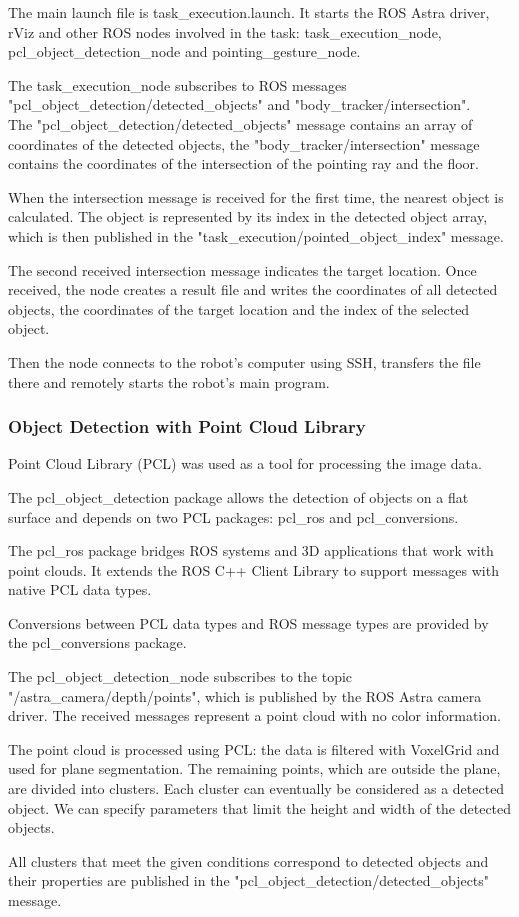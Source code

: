 The main launch file is task\_execution.launch. It starts the ROS Astra driver, rViz and other ROS nodes involved in the task: task\_execution\_node, pcl\_object\_detection\_node and pointing\_gesture\_node.\par
The task\_execution\_node subscribes to ROS messages\\
"pcl\_object\_detection/detected\_objects" and "body\_tracker/intersection".\\
The "pcl\_object\_detection/detected\_objects" message contains an array of coordinates of the detected objects, the "body\_tracker/intersection" message contains the coordinates of the intersection of the pointing ray and the floor.\par
When the intersection message is received for the first time, the nearest object is calculated. The object is represented by its index in the detected object array, which is then published in the "task\_execution/pointed\_object\_index" message.\par
The second received intersection message indicates the target location.
Once received, the node creates a result file and writes the coordinates of all detected objects, the coordinates of the target location and the index of the selected object.\par
Then the node connects to the robot's computer using SSH, transfers the file there and remotely starts the robot's main program.\par

\subsubsection{Object Detection with Point Cloud Library}
Point Cloud Library (PCL) was used as a tool for processing the image data.\par
The pcl\_object\_detection package allows the detection of objects on a flat surface and depends on two PCL packages: pcl\_ros and pcl\_conversions.\par
The pcl\_ros package bridges ROS systems and 3D applications that work with point clouds. It extends the ROS C++ Client Library to support messages with native PCL data types.\par
Conversions between PCL data types and ROS message types are provided by the pcl\_conversions package.\par
The pcl\_object\_detection\_node subscribes to the topic \\"/astra\_camera/depth/points", which is published by the ROS Astra camera driver. The received messages represent a point cloud with no color information.\par
The point cloud is processed using PCL: the data is filtered with VoxelGrid and used for plane segmentation. The remaining points, which are outside the plane, are divided into clusters.
Each cluster can eventually be considered as a detected object. We can specify parameters that limit the height and width of the detected objects.\par
All clusters that meet the given conditions correspond to detected objects and their properties are published in the "pcl\_object\_detection/detected\_objects" message.\par

